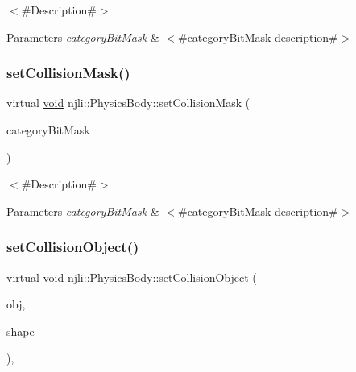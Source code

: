 $<$\#\+Description\#$>$


\begin{DoxyParams}{Parameters}
{\em category\+Bit\+Mask} & $<$\#category\+Bit\+Mask description\#$>$ \\
\hline
\end{DoxyParams}
\mbox{\label{classnjli_1_1_physics_body_a15550580fd04daffff4a9f777259fc4a}} 
\subsubsection{\texorpdfstring{set\+Collision\+Mask()}{setCollisionMask()}}
{\footnotesize\ttfamily virtual \mbox{\hyperlink{_thread_8h_af1e856da2e658414cb2456cb6f7ebc66}{void}} njli\+::\+Physics\+Body\+::set\+Collision\+Mask (\begin{DoxyParamCaption}\item[{\mbox{\hyperlink{namespacenjli_af7b302a2b48bb644f85c88080925c974}{njli\+Bit\+Categories}}}]{category\+Bit\+Mask }\end{DoxyParamCaption})\hspace{0.3cm}{\ttfamily [virtual]}}

$<$\#\+Description\#$>$


\begin{DoxyParams}{Parameters}
{\em category\+Bit\+Mask} & $<$\#category\+Bit\+Mask description\#$>$ \\
\hline
\end{DoxyParams}
\mbox{\label{classnjli_1_1_physics_body_a674974f0df3db645620c7156177659ee}} 
\subsubsection{\texorpdfstring{set\+Collision\+Object()}{setCollisionObject()}}
{\footnotesize\ttfamily virtual \mbox{\hyperlink{_thread_8h_af1e856da2e658414cb2456cb6f7ebc66}{void}} njli\+::\+Physics\+Body\+::set\+Collision\+Object (\begin{DoxyParamCaption}\item[{const bt\+Collision\+Object \&}]{obj,  }\item[{\mbox{\hyperlink{classnjli_1_1_physics_shape}{Physics\+Shape}} $\ast$}]{shape }\end{DoxyParamCaption})\hspace{0.3cm}{\ttfamily [protected]}, {}}



